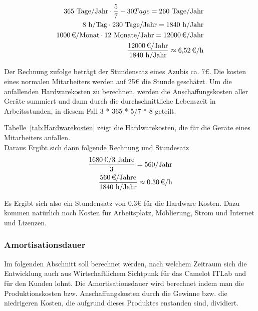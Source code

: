 \begin{eqnarray}
	365 \mbox{ Tage/Jahr} \cdot \frac{5}{7} - 30 Tage = 260 \mbox{ Tage/Jahr}\\
	8 \mbox{ h/Tag} \cdot 230 \mbox{ Tage/Jahr} = 1840 \mbox{ h/Jahr}\\
	\eur{1000}\mbox{/Monat} \cdot 12 \mbox{ Monate/Jahr} = \eur{12000} \mbox{/Jahr}\\
	\frac{\eur{12000} \mbox{/Jahr}}{1840 \mbox{ h/Jahr}} \approx \eur{6,52}\mbox{/h}
\end{eqnarray}
	
Der Rechnung zufolge beträgt der Stundensatz eines Azubis ca. 7€. Die kosten eines normalen Mitarbeiters werden auf 25€ die Stunde geschätzt. Um die anfallenden Hardwarekosten zu berechnen, werden die Anschaffungskosten aller Geräte summiert und dann durch die durchschnittliche Lebenszeit in Arbeitsstunden, in diesem Fall 3 * 365 * 5/7 * 8 geteilt.
	
Tabelle~\ref{tab:Hardwarekosten} zeigt die Hardwarekosten, die für die Geräte eines Mitarbeiters anfallen.
\\
	
Daraus Ergibt sich dann folgende Rechnung und Stundesatz
\begin{eqnarray}
	\frac{\eur{1680} \mbox{/3 Jahre}}{3} = 560 \mbox{/Jahr}\\
	\frac{\eur{560} \mbox{/Jahre}}{1840 \mbox{ h/Jahr}} \approx \eur{0.30}\mbox{/h}
\end{eqnarray}

Es Ergibt sich also ein Stundensatz von 0.3€ für die Hardware Kosten. Dazu kommen natürlich noch Kosten für Arbeitsplatz, Möblierung, Strom und Internet und Lizenzen.

\subsubsection{Amortisationsdauer}
\label{sec:Amortisationsdauer}
Im folgenden Abschnitt soll berechnet werden, nach welchem Zeitraum sich die Entwicklung auch aus Wirtschaftlichem Sichtpunk für das Camelot ITLab und für den Kunden lohnt. Die Amortisationsdauer wird berechnet indem man die Produktionskosten bzw. Anschaffungskosten durch die Gewinne bzw. die niedrigeren Kosten, die aufgrund dieses Produktes enstanden sind, dividiert.

